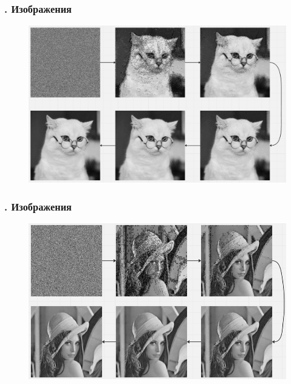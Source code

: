 \documentclass[t aspectratio=169]{beamer}
\begin{document}
  \begin{frame}\frametitle{\insertsection . Изображения}
      \begin{figure}
        \begin{center}
          \includegraphics[width=1\textwidth]{./images/cat_stages.jpg}
        \end{center}
      \end{figure}
  \end{frame}

  \begin{frame}\frametitle{\insertsection . Изображения}
      \begin{figure}
        \begin{center}
          \includegraphics[width=1\textwidth]{./images/lena_stages.jpg}
        \end{center}
      \end{figure}
  \end{frame}
\end{document}
